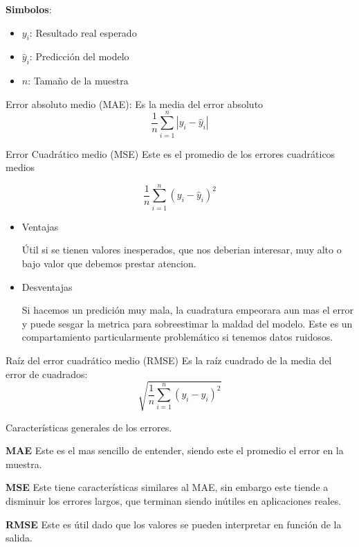 \textbf{Simbolos}:  
\begin{itemize}
    \item{\textbf{$y_i$}: Resultado real esperado}
    \item{\textbf{$\hat{y}_i$}: Predicción del modelo}
    \item{\textbf{$n$}: Tamaño de la muestra}
\end{itemize}
Error absoluto medio (MAE): Es la media del error absoluto 
\begin{equation*}
    \frac 1n\sum_{i=1}^n|y_i-\hat{y}_i|
\end{equation*}

Error Cuadrático medio (MSE) Este es el promedio de los errores cuadráticos
medios

\begin{equation*}
    \frac 1n\sum_{i=1}^n(y_i-\hat{y}_i)^2
\end{equation*}
\begin{itemize}
    \item Ventajas 

        Útil si se tienen valores inesperados, que nos deberian interesar, muy
        alto o bajo valor que debemos prestar atencion.

    \item Desventajas 

        Si hacemos un predición muy mala, la cuadratura empeorara aun mas el
        error y puede sesgar la metrica para sobreestimar la maldad del modelo.
        Este es un compartamiento particularmente problemático si tenemos datos
        ruidosos. 

\end{itemize}

Raíz del error cuadrático medio (RMSE) Es la raíz cuadrado de la media del
error de cuadrados:
\begin{equation*}
    \sqrt{\frac 1n\sum_{i=1}^n(y_i-\hat{y}_i)^2}
\end{equation*}

Características generales de los errores. 

\textbf{MAE} Este es el mas sencillo de entender, siendo este el promedio el
error en la muestra. 

\textbf{MSE} Este tiene características similares al MAE, sin embargo este
tiende a disminuir los errores largos, que terminan siendo inútiles en
aplicaciones reales. 

\textbf{RMSE} Este es útil dado que los valores se pueden interpretar en
función de la salida.

